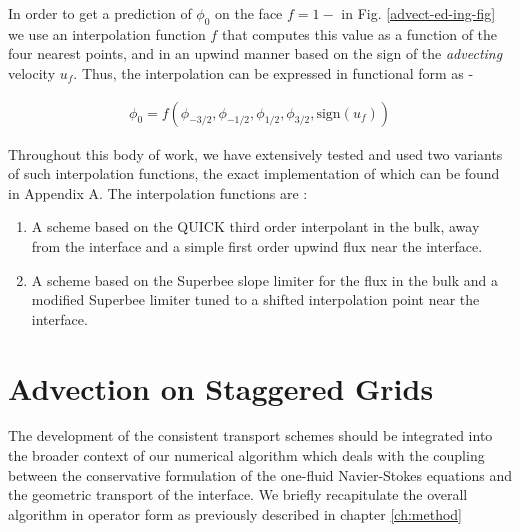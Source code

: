 In order to get a prediction of $\phi_0$ on the 
face $f=1-$ in Fig. \ref{advect-ed-ing-fig}
we use an interpolation function $f$ that computes 
this value as a function of the four nearest points,
and in an upwind manner based on the sign of the 
\textit{advecting} velocity $u_f$. Thus, the interpolation
can be expressed in functional form as - 


\begin{align}
\phi_0 = f \left( \phi_{-3/2}, \phi_{-1/2}, \phi_{1/2},\phi_{3/2},\textrm{sign}(u_f) \right)
\label{simpleinterp}
\end{align}


Throughout this body of work, we have extensively tested and used 
two variants of such interpolation functions, the exact implementation 
of which can be found in Appendix A. The interpolation functions are :



\begin{enumerate}
\item A scheme based on the QUICK 
third order interpolant in the bulk, away from the interface 
and a simple first order upwind flux near the interface. 
\item A scheme based on the Superbee slope limiter  for the flux in the 
bulk and a modified Superbee limiter tuned to a shifted interpolation point near the 
interface.  
\end{enumerate}


\section{Advection on Staggered Grids}

The development of the consistent transport schemes should be integrated into
the broader context of our numerical algorithm which deals with the 
coupling between the conservative formulation of the 
one-fluid Navier-Stokes equations and the geometric transport of the interface.  
We briefly recapitulate the overall algorithm in operator form as previously described in 
chapter \ref{ch:method}


